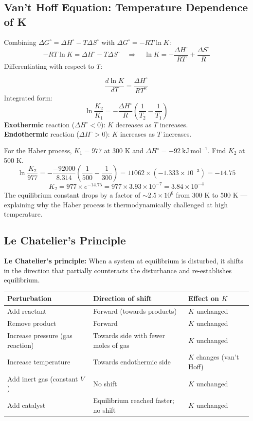 \documentclass[12pt,a4paper]{article}
\begin{document}
\subsection{Van't Hoff Equation: Temperature Dependence of K}
Combining $\Delta G^\circ = \Delta H^\circ - T\Delta S^\circ$ with $\Delta G^\circ = -RT\ln K$:
\[
-RT\ln K = \Delta H^\circ - T\Delta S^\circ
\quad\Rightarrow\quad
\ln K = -\frac{\Delta H^\circ}{RT} + \frac{\Delta S^\circ}{R}
\]
Differentiating with respect to $T$:

\begin{tcolorbox}[formulabox, title={Van't Hoff Equation}]
\[
\frac{d\ln K}{dT} = \frac{\Delta H^\circ}{RT^2}
\]
Integrated form:
\[
\ln\frac{K_2}{K_1} = -\frac{\Delta H^\circ}{R}\!\left(\frac{1}{T_2}-\frac{1}{T_1}\right)
\]
\textbf{Exothermic} reaction ($\Delta H^\circ < 0$): $K$ decreases as $T$ increases.\\
\textbf{Endothermic} reaction ($\Delta H^\circ > 0$): $K$ increases as $T$ increases.
\end{tcolorbox}

\begin{tcolorbox}[examplebox, title={Solved Example: Van't Hoff Equation}]
For the Haber process, $K_1 = 977$ at 300 K and $\Delta H^\circ = -92\ \mathrm{kJ\,mol^{-1}}$. Find $K_2$ at 500 K.
\[
\ln\frac{K_2}{977} = -\frac{-92000}{8.314}\!\left(\frac{1}{500}-\frac{1}{300}\right) = 11062\times(-1.333\times10^{-3}) = -14.75
\]
\[
K_2 = 977\times e^{-14.75} = 977\times3.93\times10^{-7} = 3.84\times10^{-4}
\]
The equilibrium constant drops by a factor of $\sim 2.5\times10^6$ from 300 K to 500 K --- explaining why the Haber process is thermodynamically challenged at high temperature.
\end{tcolorbox}

\subsection{Le Chatelier's Principle}
\begin{tcolorbox}[defbox]
\textbf{Le Chatelier's principle:} When a system at equilibrium is disturbed, it shifts in the direction that partially counteracts the disturbance and re-establishes equilibrium.
\end{tcolorbox}

\begin{tabularx}{\linewidth}{|B{2.6cm}|Y|Y|}
\hline
\textbf{Perturbation} & \textbf{Direction of shift} & \textbf{Effect on $K$} \\
\hline
Add reactant & Forward (towards products) & $K$ unchanged \\
\hline
Remove product & Forward & $K$ unchanged \\
\hline
Increase pressure (gas reaction) & Towards side with fewer moles of gas & $K$ unchanged \\
\hline
Increase temperature & Towards endothermic side & $K$ changes (van't Hoff) \\
\hline
Add inert gas (constant $V$) & No shift & $K$ unchanged \\
\hline
Add catalyst & Equilibrium reached faster; no shift & $K$ unchanged \\
\hline
\end{tabularx}
\end{document}
